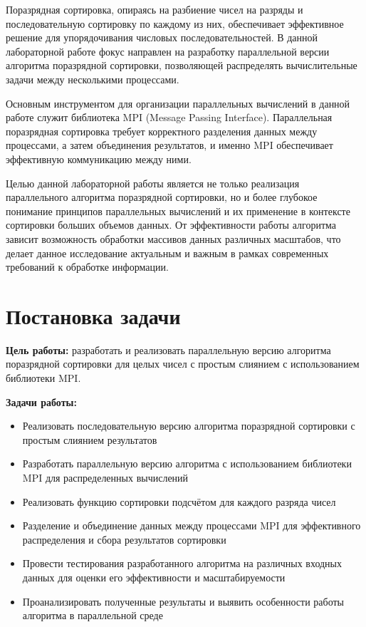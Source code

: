 \documentclass[a4paper, 14pt]{article}
\theoremstyle{plain}
\begin{document}
Поразрядная сортировка, опираясь на разбиение чисел на разряды и последовательную сортировку по каждому из них, обеспечивает эффективное решение для упорядочивания числовых последовательностей. В данной лабораторной работе фокус направлен на разработку параллельной версии алгоритма поразрядной сортировки, позволяющей распределять вычислительные задачи между несколькими процессами.

Основным инструментом для организации параллельных вычислений в данной работе служит библиотека MPI (Message Passing Interface). Параллельная поразрядная сортировка требует корректного разделения данных между процессами, а затем объединения результатов, и именно MPI обеспечивает эффективную коммуникацию между ними.

Целью данной лабораторной работы является не только реализация параллельного алгоритма поразрядной сортировки, но и более глубокое понимание принципов параллельных вычислений и их применение в контексте сортировки больших объемов данных. От эффективности работы алгоритма зависит возможность обработки массивов данных различных масштабов, что делает данное исследование актуальным и важным в рамках современных требований к обработке информации.


\newpage
\section*{\centering Постановка задачи}
\textbf{Цель работы:} разработать и реализовать параллельную версию алгоритма поразрядной сортировки для целых чисел с простым слиянием с использованием библиотеки MPI. 

\textbf{Задачи работы:}
\vspace{-1em}
\begin{itemize}[leftmargin=3em]
	\setlength\itemsep{0cm}
	\item Реализовать последовательную версию алгоритма поразрядной сортировки с простым слиянием результатов
	\item Разработать параллельную версию алгоритма с использованием библиотеки MPI для распределенных вычислений
	\item Реализовать функцию сортировки подсчётом для каждого разряда чисел
	\item Разделение и объединение данных между процессами MPI для эффективного распределения и сбора результатов сортировки
	\item Провести тестирования разработанного алгоритма на различных входных данных для оценки его эффективности и масштабируемости
	\item Проанализировать полученные результаты и выявить особенности работы алгоритма в параллельной среде
\end{itemize}
\end{document}
